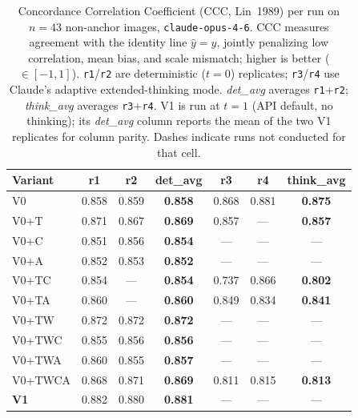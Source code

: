\begin{table}[t]
  \centering
  \caption{Concordance Correlation Coefficient (CCC, Lin~1989) per run
    on $n = 43$ non-anchor images, \texttt{claude-opus-4-6}. CCC
    measures agreement with the identity line $\hat{y} = y$, jointly
    penalizing low correlation, mean bias, and scale mismatch; higher
    is better ($\in [-1, 1]$). \texttt{r1}/\texttt{r2} are
    deterministic ($t = 0$) replicates; \texttt{r3}/\texttt{r4} use
    Claude's adaptive extended-thinking mode.
    \emph{det\_avg} averages \texttt{r1}+\texttt{r2};
    \emph{think\_avg} averages \texttt{r3}+\texttt{r4}. V1 is run at
    $t = 1$ (API default, no thinking); its \emph{det\_avg} column
    reports the mean of the two V1 replicates for column parity.
    Dashes indicate runs not conducted for that cell.}
  \label{tab:ccc}
  \small
  \begin{tabular*}{\linewidth}{@{\extracolsep{\fill}}lcccccc@{}}
    \toprule
    Variant & r1 & r2 & \textbf{det\_avg} & r3 & r4 & \textbf{think\_avg}\\
    \midrule
    V0          & 0.858 & 0.859 & \textbf{0.858} & 0.868 & 0.881 & \textbf{0.875}\\
    V0+T        & 0.871 & 0.867 & \textbf{0.869} & 0.857 & ---   & \textbf{0.857}\\
    V0+C        & 0.851 & 0.856 & \textbf{0.854} & ---   & ---   & ---\\
    V0+A        & 0.852 & 0.853 & \textbf{0.852} & ---   & ---   & ---\\
    V0+TC       & 0.854 & ---   & \textbf{0.854} & 0.737 & 0.866 & \textbf{0.802}\\
    V0+TA       & 0.860 & ---   & \textbf{0.860} & 0.849 & 0.834 & \textbf{0.841}\\
    V0+TW       & 0.872 & 0.872 & \textbf{0.872} & ---   & ---   & ---\\
    V0+TWC      & 0.855 & 0.856 & \textbf{0.856} & ---   & ---   & ---\\
    V0+TWA      & 0.860 & 0.855 & \textbf{0.857} & ---   & ---   & ---\\
    V0+TWCA     & 0.868 & 0.871 & \textbf{0.869} & 0.811 & 0.815 & \textbf{0.813}\\
    \textbf{V1} & 0.882 & 0.880 & \textbf{0.881} & ---   & ---   & ---\\
    \bottomrule
  \end{tabular*}
\end{table}

